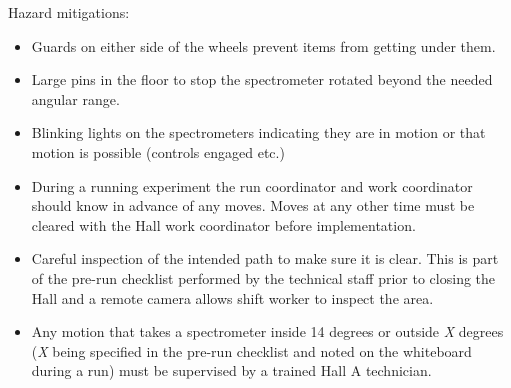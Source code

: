 \begin{safetyen}{0}{0}
Hazard mitigations:
\begin{itemize}
\item{Guards on either side of the wheels prevent items from getting under them.}
\item{Large pins in the floor to stop the spectrometer rotated beyond the needed angular range.}
\item{Blinking lights on the spectrometers indicating they are in motion or that motion
is possible (controls engaged etc.)}
\item{During a running experiment the run coordinator and work coordinator should know in advance 
of any moves.  Moves at any other time must be cleared with the Hall work coordinator 
before implementation.}
\item{Careful inspection of the intended path to make sure it is clear. This is part of
the pre-run checklist performed by the technical staff prior to closing the Hall and
a remote camera allows shift worker to inspect the area.}
\item{Any motion that takes a spectrometer inside 14 degrees or outside \emph{X} degrees
(\emph{X} being specified in the pre-run checklist and noted on the whiteboard during a run) 
must be supervised by a trained Hall A technician.}
\end{itemize}
\end{safetyen}

